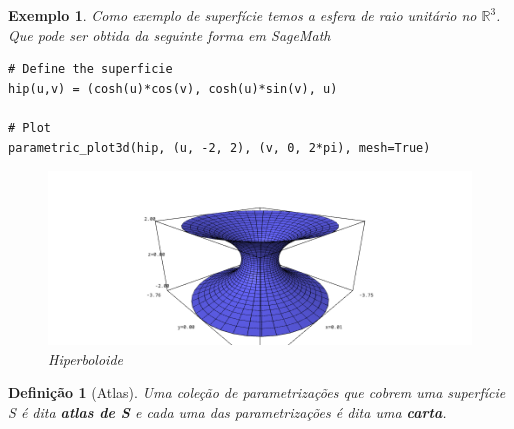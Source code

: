 \documentclass[12pt]{article}
\newtheorem{ex}{Exemplo}[section]
\newtheorem{definition}{Definição}
\begin{document}
\begin{ex}
Como exemplo de superfície temos a esfera de raio unitário no $\mathbb{R}^3$. Que pode ser obtida da seguinte forma em \textit{SageMath}

\begin{lstlisting}
# Define the superficie
hip(u,v) = (cosh(u)*cos(v), cosh(u)*sin(v), u)

# Plot
parametric_plot3d(hip, (u, -2, 2), (v, 0, 2*pi), mesh=True)
\end{lstlisting}

\begin{figure}[H]
    \centering
    \includegraphics[scale=.5]{Images/ex1-1.png}
    \caption{Hiperboloide}
    \label{fig:ex1-1}
\end{figure}
\end{ex}

\begin{definition}[Atlas]
Uma coleção de parametrizações que cobrem uma superfície S é dita \textbf{atlas de S} e cada uma das parametrizações é dita uma \textbf{carta}.
\end{definition}
\end{document}
